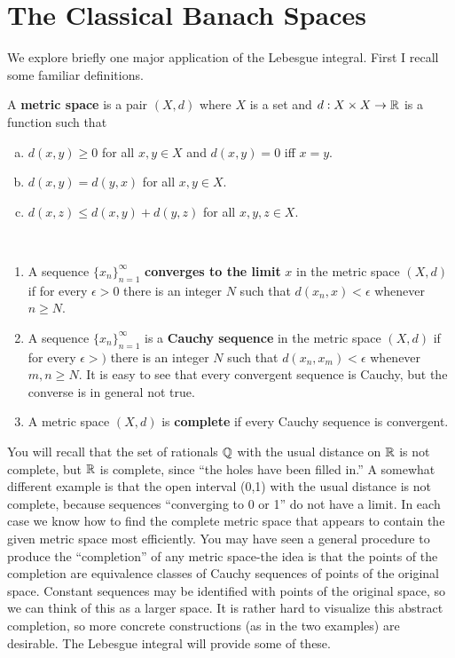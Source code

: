 \chapter{The Classical Banach Spaces}
\begin{rmk}%
	We explore briefly one major application of the Lebesgue integral. 
	First I recall some familiar definitions. 
\end{rmk}

\begin{defn}\label{d:metricspace}%
	A \textbf{metric space} is a pair $(X, d)$ where $X$ is a set 
	and $d: X \times X \rightarrow \mathbb{R}$ is a function such that 
	\begin{enumerate}[(a)]
	\item $d(x, y) \ge 0$ for all $x, y \in X$ and $d(x,y) = 0$ iff $x = y$. 
	\item $d(x, y) = d(y, x)$ for all $x, y \in X$. 
	\item $d(x, z) \le d(x, y) + d(y, z)$ for all $x, y, z \in X$.
	\end{enumerate}
\end{defn}

\begin{defn}~%
	\begin{enumerate}
	\item A sequence $\{x_n\}_{n=1}^\infty$ \textbf{converges to the limit} 
		$x$ in the metric space $(X,d)$ if for every $\epsilon > 0$ there is an 
		integer $N$ such that $d(x_n,x) < \epsilon$ whenever $n \ge N$. 
	\item A sequence $\{x_n\}_{n=1}^\infty$ is a \textbf{Cauchy sequence} 
		in the metric space $(X,d)$ if for every $\epsilon > )$ there is an 
		integer $N$ such that $d(x_n,x_m) < \epsilon$ whenever $m,n \ge N$. It 
		is easy to see that every convergent sequence is Cauchy, but the converse 
		is in general not true. 
	\item A metric space $(X,d)$ is \textbf{complete} if every Cauchy sequence 
		is convergent. 
	\end{enumerate}
\end{defn}

\begin{rmk}%
	You will recall that the set of rationals $\mathbb{Q}$ with the usual distance on $\mathbb{R}$ 
	is not complete, but $\mathbb{R}$ is complete, since ``the holes have been filled in.'' 
	A somewhat different example is that the open interval (0,1) with the usual 
	distance is not complete, because sequences ``converging to 0 or 1'' do not 
	have a limit. In each case we know how to find the complete metric space that 
	appears to contain the given metric space most efficiently. You may have seen 
	a general procedure to produce the ``completion'' of any metric space-the idea 
	is that the points of the completion are equivalence classes of Cauchy sequences 
	of points of the original space. Constant sequences may be identified with 
	points of the original space, so we can think of this as a larger space. It is 
	rather hard to visualize this abstract completion, so more concrete constructions 
	(as in the two examples) are desirable. The Lebesgue integral will provide some 
	of these. 
\end{rmk}

